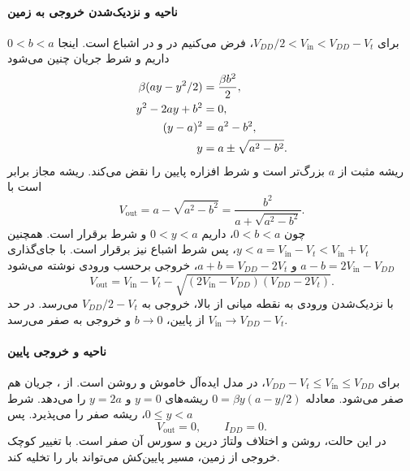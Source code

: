 \paragraph*{ناحیه  و نزدیک‌شدن خروجی به زمین}
برای \(V_{DD}/2<V_{\mathrm{in}}<V_{DD}-V_t\)، فرض می‌کنیم
 در  و  در اشباع است.
اینجا \(0<b<a\) داریم و شرط جریان چنین می‌شود
\begin{align}
 \beta(ay-y^2/2)&=\frac{\beta b^2}{2},\notag\\
 y^2-2ay+b^2&=0,\notag\\
 (y-a)^2&=a^2-b^2,\notag\\
 y&=a\pm\sqrt{a^2-b^2}.
 \label{eq:inverter-d-quadratic}
\end{align}
ریشه مثبت از \(a\) بزرگ‌تر است و شرط  افزاره پایین
را نقض می‌کند. ریشه مجاز برابر است با
\begin{equation}
 \boxed{V_{\mathrm{out}}=a-\sqrt{a^2-b^2}}
 =\frac{b^2}{a+\sqrt{a^2-b^2}}.
 \label{eq:inverter-d-root}
\end{equation}
چون \(0<b<a\)، داریم \(0<y<a\) و شرط  برقرار است.
همچنین \(y<a=V_{\mathrm{in}}-V_t<
V_{\mathrm{in}}+V_t\)، پس شرط اشباع  نیز برقرار است.
با جای‌گذاری \(a-b=2V_{\mathrm{in}}-V_{DD}\) و
\(a+b=V_{DD}-2V_t\)، خروجی برحسب ورودی نوشته می‌شود
\begin{equation}
 \boxed{V_{\mathrm{out}}=V_{\mathrm{in}}-V_t-
 \sqrt{(2V_{\mathrm{in}}-V_{DD})(V_{DD}-2V_t)}}.
 \label{eq:inverter-d-transfer}
\end{equation}
با نزدیک‌شدن ورودی به نقطه میانی از بالا، خروجی به
\(V_{DD}/2-V_t\) می‌رسد. در حد
\(V_{\mathrm{in}}\to V_{DD}-V_t\) از پایین،
\(b\to0\) و خروجی به صفر می‌رسد.

\paragraph*{ناحیه  و خروجی پایین}
برای \(V_{DD}-V_t\le V_{\mathrm{in}}\le V_{DD}\)،
 در مدل ایده‌آل خاموش و  روشن است.
از ، جریان  هم صفر می‌شود.
معادله \(0=\beta y(a-y/2)\) ریشه‌های \(y=0\) و \(y=2a\)
را می‌دهد. شرط \(0\le y<a\)، ریشه صفر را می‌پذیرد. پس
\begin{equation}
 \boxed{V_{\mathrm{out}}=0,\qquad I_{DD}=0}.
 \label{eq:inverter-region-e}
\end{equation}
در این حالت،  روشن و اختلاف ولتاژ درین و سورس آن صفر
است. با تغییر کوچک خروجی از زمین، مسیر پایین‌کش می‌تواند بار را
تخلیه کند.

